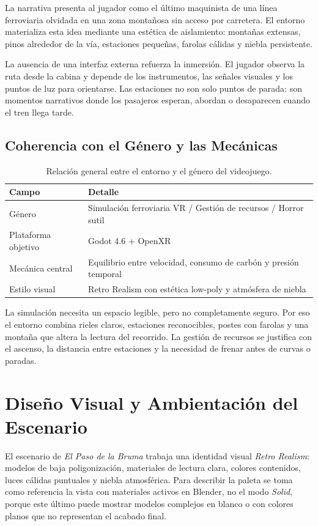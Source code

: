 \documentclass[11pt,letterpaper]{article}
\begin{document}
La narrativa presenta al jugador como el último maquinista de una línea ferroviaria olvidada en una zona montañosa sin acceso por carretera. El entorno materializa esta idea mediante una estética de aislamiento: montañas extensas, pinos alrededor de la vía, estaciones pequeñas, farolas cálidas y niebla persistente.

La ausencia de una interfaz externa refuerza la inmersión. El jugador observa la ruta desde la cabina y depende de los instrumentos, las señales visuales y los puntos de luz para orientarse. Las estaciones no son solo puntos de parada: son momentos narrativos donde los pasajeros esperan, abordan o desaparecen cuando el tren llega tarde.

\subsection{Coherencia con el Género y las Mecánicas}

\begin{table}[H]
\centering
\begin{tabularx}{\textwidth}{@{}L{4cm}Y@{}}
\toprule
\textbf{Campo} & \textbf{Detalle}\\
\midrule
Género & Simulación ferroviaria VR / Gestión de recursos / Horror sutil\\
Plataforma objetivo & Godot 4.6 + OpenXR\\
Mecánica central & Equilibrio entre velocidad, consumo de carbón y presión temporal\\
Estilo visual & Retro Realism con estética low-poly y atmósfera de niebla\\
\bottomrule
\end{tabularx}
\caption{Relación general entre el entorno y el género del videojuego.}
\end{table}

La simulación necesita un espacio legible, pero no completamente seguro. Por eso el entorno combina rieles claros, estaciones reconocibles, postes con farolas y una montaña que altera la lectura del recorrido. La gestión de recursos se justifica con el ascenso, la distancia entre estaciones y la necesidad de frenar antes de curvas o paradas.

\section{Diseño Visual y Ambientación del Escenario}

El escenario de \textit{El Paso de la Bruma} trabaja una identidad visual \textit{Retro Realism}: modelos de baja poligonización, materiales de lectura clara, colores contenidos, luces cálidas puntuales y niebla atmosférica. Para describir la paleta se toma como referencia la vista con materiales activos en Blender, no el modo \textit{Solid}, porque este último puede mostrar modelos complejos en blanco o con colores planos que no representan el acabado final.
\end{document}
